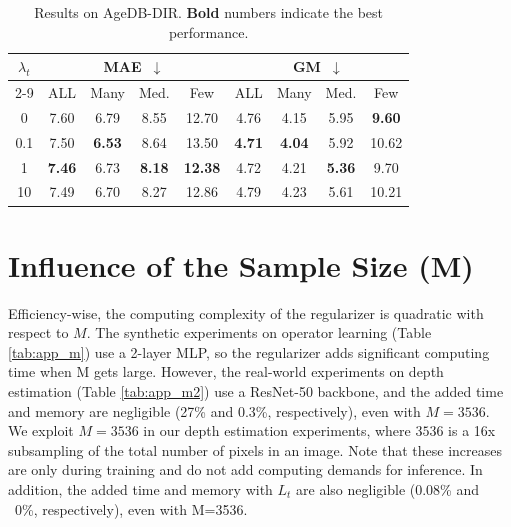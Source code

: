 \documentclass{article} %
\newcommand{\AY}[1]{{\color{purple} {\bf (AY: #1)}}}
\begin{document}
\begin{table}[h]
	\caption{Results on AgeDB-DIR. 
	\textbf{Bold} numbers indicate the best performance.
	}
	\label{tab:age_lambda_t}
	\centering
		\begin{tabular}{c|cccc|cccc}
			\hline
			\multirow{2}[0]{*}{$\lambda_t$} & \multicolumn{4}{c|}{MAE~$\downarrow$} & \multicolumn{4}{c}{GM~$\downarrow$}  \\
 			\cline{2-9}
 			
			& ALL & Many & Med. & Few & ALL & Many & Med. & Few\\
			\hline
			0 & 7.60 & 6.79 & 8.55 & 12.70 & 4.76 & 4.15 & 5.95 & \textbf{9.60} \\
			0.1 & 7.50 & \textbf{6.53} & 8.64 & 13.50 & \textbf{4.71} & \textbf{4.04} & 5.92 & 10.62 \\
			1 & \textbf{7.46} & 6.73 & \textbf{8.18} & \textbf{12.38} & 4.72 & 4.21 & \textbf{5.36} & 9.70 \\
			10 & 7.49 & 6.70 & 8.27 & 12.86 & 4.79 & 4.23 & 5.61 & 10.21 \\
			\hline
		\end{tabular}
\end{table}

\section{Influence of the Sample Size (M)}
\label{app_m}


Efficiency-wise, the computing complexity of the regularizer is quadratic with respect to $M$.  The synthetic experiments on operator learning (Table \ref{tab:app_m}) use a 2-layer MLP, so the regularizer adds significant computing time when M gets large. However, the real-world experiments on depth estimation (Table \ref{tab:app_m2}) use a ResNet-50 backbone, and the added time and memory are negligible (27\% and 0.3\%, respectively), even with $M=3536$. We exploit $M=3536$ in our depth estimation experiments, where $3536$ is a 16x subsampling of the total number of pixels in an image. Note that these increases are only during training and do not add computing demands for inference. In addition, the added time and memory with $L_t$ are also negligible (0.08\% and ~0\%, respectively), even with M=3536.
\end{document}
